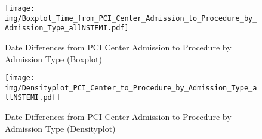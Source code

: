 \documentclass[presentation,xcolor=pdftex,dvipsnames,table,11pt]{beamer}
\begin{document}
\begin{tiny}
\begin{frame}
\begin{figure}
  \centering
  \caption{Date Differences from PCI Center Admission to Procedure by Admission Type (Boxplot)}
  \label{Boxplot: Date Differences from PCI Center Admission to Procedure by Admission Type}
\texttt{[image: img/Boxplot\_Time\_from\_PCI\_Center\_Admission\_to\_Procedure\_by\_Admission\_Type\_allNSTEMI.pdf]}\end{figure}
\end{frame}


\begin{frame}
\begin{figure}
  \centering
  \caption{Date Differences from PCI Center Admission to Procedure by Admission Type (Densityplot)}
  \label{Density: Date Differences from PCI Center Admission to Procedure by Admission Type}
\texttt{[image: img/Densityplot\_PCI\_Center\_to\_Procedure\_by\_Admission\_Type\_allNSTEMI.pdf]}\end{figure}
\end{frame}



\end{tiny}
\end{document}
